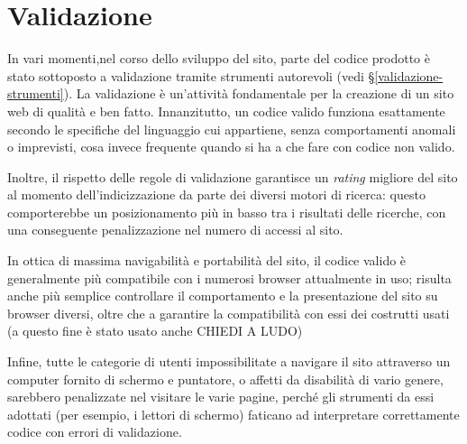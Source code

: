 \section{Validazione}
\label{validazione}
In vari momenti,nel corso dello sviluppo del sito, parte del codice prodotto è stato sottoposto a validazione tramite strumenti autorevoli (vedi §\ref{validazione-strumenti}). La validazione è un'attività fondamentale per la creazione di un sito web di qualità e ben fatto. Innanzitutto, un codice valido funziona esattamente secondo le specifiche del linguaggio cui appartiene, senza comportamenti anomali o imprevisti, cosa invece frequente  quando si ha a che fare con codice non valido. 

Inoltre, il rispetto delle regole di validazione garantisce un \textit{rating} migliore del sito al momento dell'indicizzazione da parte dei diversi motori di ricerca: questo comporterebbe un posizionamento più in basso tra i risultati delle ricerche, con una conseguente penalizzazione nel numero di accessi al sito.

In ottica di massima navigabilità e portabilità del sito, il codice valido è generalmente più compatibile con i numerosi browser attualmente in uso; risulta anche più semplice controllare il comportamento e la presentazione del sito su browser diversi, oltre che a garantire la compatibilità con essi dei costrutti usati (a questo fine è stato usato anche CHIEDI A LUDO)

Infine, tutte le categorie di utenti impossibilitate a navigare il sito attraverso un computer fornito di schermo e puntatore, o affetti da disabilità di vario genere, sarebbero penalizzate nel visitare le varie pagine, perché gli strumenti da essi adottati (per esempio, i lettori di schermo) faticano ad interpretare correttamente codice con errori di validazione.



